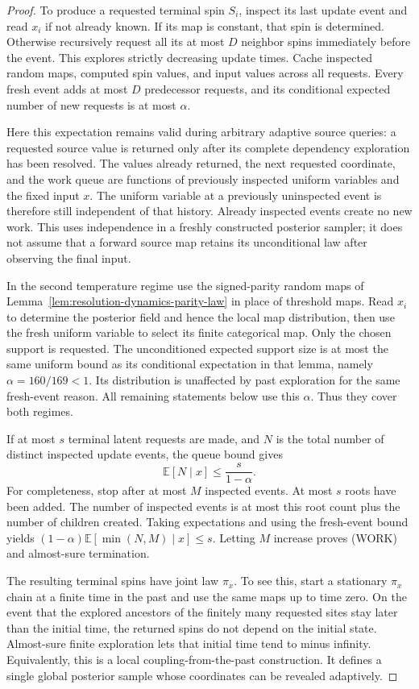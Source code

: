 \begin{proof}
To produce a requested terminal spin \(S_i\), inspect its last update
event and read \(x_i\) if not already known. If its map is constant,
that spin is determined. Otherwise recursively request all its at most
\(D\) neighbor spins immediately before the event. This explores
strictly decreasing update times. Cache inspected random maps,
computed spin values, and input values across all requests. Every
fresh event adds at most \(D\) predecessor requests, and its conditional
expected number of new requests is at most \(\alpha\).

Here this expectation remains valid during arbitrary adaptive source
queries: a requested source value is returned only after its complete
dependency exploration has been resolved. The values already returned,
the next requested coordinate, and the work queue are functions of
previously inspected uniform variables and the fixed input \(x\).
The uniform variable at a previously uninspected event is therefore
still independent of that history. Already inspected events create no
new work. This uses independence in a freshly constructed posterior
sampler; it does not assume that a forward source map retains its
unconditional law after observing the final input.

In the second temperature regime use the signed-parity random maps of
Lemma~\ref{lem:resolution-dynamics-parity-law} in place of threshold
maps. Read \(x_i\) to determine the posterior field and hence the
local map distribution, then use the fresh uniform variable to select
its finite categorical map. Only the chosen support is requested.
The unconditioned expected support size is at most the same uniform
bound as its conditional expectation in that lemma, namely
\(\alpha=160/169<1\). Its distribution is unaffected by past
exploration for the same fresh-event reason. All remaining statements
below use this \(\alpha\). Thus they cover both regimes.

If at most \(s\) terminal latent requests are made, and \(N\) is
the total number of distinct inspected update events, the queue bound
gives
\[
 \mathbb E[N\mid x]\le \frac{s}{1-\alpha}.
 \tag{WORK}
\]
For completeness, stop after at most \(M\) inspected events. At most
\(s\) roots have been added. The number of inspected events is at
most this root count plus the number of children created. Taking
expectations and using the fresh-event bound yields
\((1-\alpha)\mathbb E[\min(N,M)\mid x]\le s\).
Letting \(M\) increase proves (WORK) and almost-sure termination.

The resulting terminal spins have joint law \(\pi_x\). To see this,
start a stationary \(\pi_x\) chain at a finite time in the past and
use the same maps up to time zero. On the event that the explored
ancestors of the finitely many requested sites stay later than the
initial time, the returned spins do not depend on the initial state.
Almost-sure finite exploration lets that initial time tend to minus
infinity. Equivalently, this is a local coupling-from-the-past
construction. It defines a single global posterior sample whose
coordinates can be revealed adaptively.


\end{proof}
